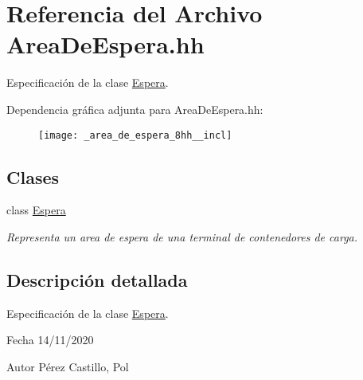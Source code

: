\hypertarget{_area_de_espera_8hh}{}\section{Referencia del Archivo Area\+De\+Espera.\+hh}
\label{_area_de_espera_8hh}


Especificación de la clase \hyperlink{class_espera}{Espera}.  


Dependencia gráfica adjunta para Area\+De\+Espera.\+hh\+:\nopagebreak
\begin{figure}[H]
\begin{center}
\leavevmode
\texttt{[image: \_area\_de\_espera\_8hh\_\_incl]}
\end{center}
\end{figure}
\subsection*{Clases}
\begin{DoxyCompactItemize}
\item 
class \hyperlink{class_espera}{Espera}
\begin{DoxyCompactList}\small\item\em Representa un area de espera de una terminal de contenedores de carga. \end{DoxyCompactList}\end{DoxyCompactItemize}


\subsection{Descripción detallada}
Especificación de la clase \hyperlink{class_espera}{Espera}. 

\begin{DoxyDate}{Fecha}
14/11/2020 
\end{DoxyDate}
\begin{DoxyAuthor}{Autor}
Pérez Castillo, Pol 
\end{DoxyAuthor}
